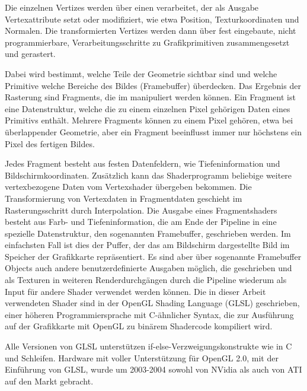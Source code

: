 Die einzelnen Vertizes werden über einen 
verarbeitet, der als Ausgabe Vertexattribute setzt oder modifiziert,
wie etwa Position, Texturkoordinaten und Normalen. Die transformierten
Vertizes werden dann über fest eingebaute, \Pimiddydh nicht
programmierbare, Verarbeitungsschritte zu Grafikprimitiven
zusammengesetzt und gerastert.

Dabei wird bestimmt, welche Teile der Geometrie sichtbar sind und
welche Primitive welche Bereiche des Bildes (\PimiddyzB Framebuffer)
überdecken. Das Ergebnis der Rasterung sind Fragments, die im
 manipuliert werden können. Ein
Fragment ist eine Datenstruktur, welche die zu einem einzelnen Pixel
gehörigen Daten eines Primitivs enthält. Mehrere Fragments können zu
einem Pixel gehören, etwa bei überlappender Geometrie, aber ein
Fragment beeinflusst immer nur höchstens ein Pixel des fertigen
Bildes.

Jedes Fragment besteht aus festen Datenfeldern, wie Tiefeninformation
und Bildschirmkoordinaten. Zusätzlich kann das Shaderprogramm
beliebige weitere vertexbezogene Daten vom Vertexshader übergeben
bekommen. Die Transformierung von Vertexdaten in Fragmentdaten
geschieht im Rasterungsschritt durch Interpolation. Die Ausgabe eines
Fragmentshaders besteht aus Farb- und Tiefeninformation, die am Ende
der Pipeline in eine spezielle Datenstruktur, den sogenannten
Framebuffer, geschrieben werden. Im einfachsten Fall ist dies der
Puffer, der das am Bildschirm dargestellte Bild im Speicher der
Grafikkarte repräsentiert. Es sind aber über sogenannte Framebuffer
Objects auch andere benutzerdefinierte Ausgaben möglich, die
geschrieben und \PimiddyzB als Texturen in weiteren Renderdurchgängen
durch die Pipeline wiederum als Input für andere Shader verwendet
werden können.  Die in dieser Arbeit verwendeten Shader sind in der
OpenGL Shading Language (GLSL) geschrieben, einer höheren
Programmiersprache mit C-ähnlicher Syntax, die zur Ausführung auf der
Grafikkarte mit OpenGL zu binärem Shadercode kompiliert wird.

Alle Versionen von GLSL unterstützen if-else-Verzweigungskonstrukte
wie in C und Schleifen.  Hardware mit voller Unterstützung für OpenGL
2.0, mit der Einführung von GLSL, wurde um 2003-2004 sowohl von NVidia
als auch von ATI auf den Markt gebracht.
